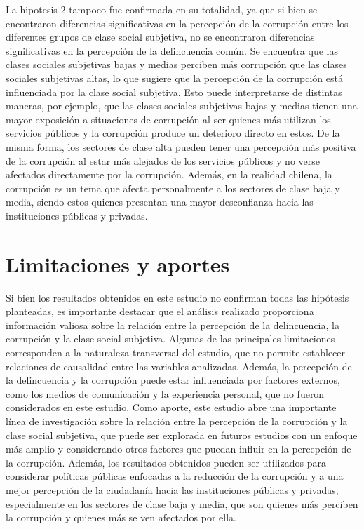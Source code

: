 \documentclass[
  spanish,
  a4paper,
  oneside]{scrbook}
\begin{document}
La hipotesis 2 tampoco fue confirmada en su totalidad, ya que si bien se
encontraron diferencias significativas en la percepción de la corrupción
entre los diferentes grupos de clase social subjetiva, no se encontraron
diferencias significativas en la percepción de la delincuencia común. Se
encuentra que las clases sociales subjetivas bajas y medias perciben más
corrupción que las clases sociales subjetivas altas, lo que sugiere que
la percepción de la corrupción está influenciada por la clase social
subjetiva. Esto puede interpretarse de distintas maneras, por ejemplo,
que las clases sociales subjetivas bajas y medias tienen una mayor
exposición a situaciones de corrupción al ser quienes más utilizan los
servicios públicos y la corrupción produce un deterioro directo en
estos. De la misma forma, los sectores de clase alta pueden tener una
percepción más positiva de la corrupción al estar más alejados de los
servicios públicos y no verse afectados directamente por la corrupción.
Además, en la realidad chilena, la corrupción es un tema que afecta
personalmente a los sectores de clase baja y media, siendo estos quienes
presentan una mayor desconfianza hacia las instituciones públicas y
privadas.

\section{Limitaciones y aportes}\label{limitaciones-y-aportes}

Si bien los resultados obtenidos en este estudio no confirman todas las
hipótesis planteadas, es importante destacar que el análisis realizado
proporciona información valiosa sobre la relación entre la percepción de
la delincuencia, la corrupción y la clase social subjetiva. Algunas de
las principales limitaciones corresponden a la naturaleza transversal
del estudio, que no permite establecer relaciones de causalidad entre
las variables analizadas. Además, la percepción de la delincuencia y la
corrupción puede estar influenciada por factores externos, como los
medios de comunicación y la experiencia personal, que no fueron
considerados en este estudio. Como aporte, este estudio abre una
importante línea de investigación sobre la relación entre la percepción
de la corrupción y la clase social subjetiva, que puede ser explorada en
futuros estudios con un enfoque más amplio y considerando otros factores
que puedan influir en la percepción de la corrupción. Además, los
resultados obtenidos pueden ser utilizados para considerar políticas
públicas enfocadas a la reducción de la corrupción y a una mejor
percepción de la ciudadanía hacia las instituciones públicas y privadas,
especialmente en los sectores de clase baja y media, que son quienes más
perciben la corrupción y quienes más se ven afectados por ella.
\end{document}
